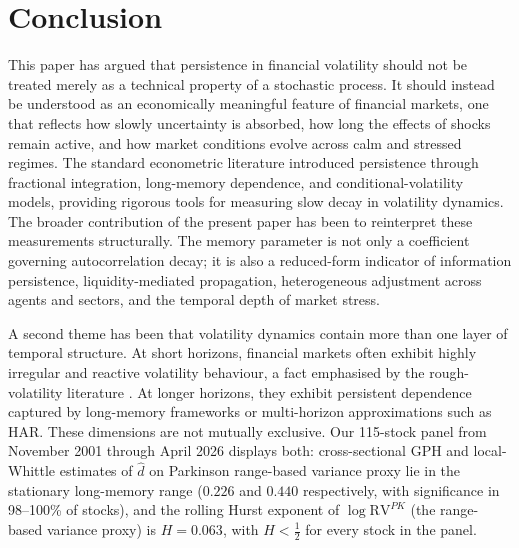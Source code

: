 \documentclass[11pt,a4paper]{article}
\newcommand{\RVPK}{\mathrm{RV}^{PK}}
\newcommand{\dhat}{\hat d}
\begin{document}
\section{Conclusion}
\label{sec:conclusion}

This paper has argued that persistence in financial volatility should
not be treated merely as a technical property of a stochastic process.
It should instead be understood as an economically meaningful feature of
financial markets, one that reflects how slowly uncertainty is absorbed,
how long the effects of shocks remain active, and how market conditions
evolve across calm and stressed regimes. The standard econometric
literature introduced persistence through fractional integration,
long-memory dependence, and conditional-volatility models, providing
rigorous tools for measuring slow decay in volatility dynamics. The
broader contribution of the present paper has been to reinterpret these
measurements structurally. The memory parameter is not only a
coefficient governing autocorrelation decay; it is also a reduced-form
indicator of information persistence, liquidity-mediated propagation,
heterogeneous adjustment across agents and sectors, and the temporal
depth of market stress.

A second theme has been that volatility dynamics contain more than one
layer of temporal structure. At short horizons, financial markets often
exhibit highly irregular and reactive volatility behaviour, a fact
emphasised by the rough-volatility literature
\citep{gatheral2018volatility}. At longer horizons, they exhibit
persistent dependence captured by long-memory frameworks or multi-horizon
approximations such as HAR. These dimensions are not mutually exclusive.
Our 115-stock panel from November 2001 through April 2026 displays
both: cross-sectional GPH and local-Whittle estimates of $\dhat$ on
Parkinson range-based variance proxy lie in the stationary long-memory range
($0.226$ and $0.440$ respectively, with significance in 98--100\% of
stocks), and the rolling Hurst exponent of $\log\RVPK$ (the range-based
variance proxy) is $H = 0.063$, with $H<\tfrac12$ for every stock in the
panel.
\end{document}
